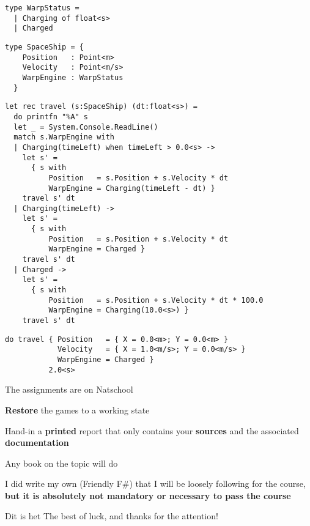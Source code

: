 \documentclass{beamer}
\begin{document}
\begin{frame}[fragile]
\begin{lstlisting}
type WarpStatus =
  | Charging of float<s>
  | Charged
\end{lstlisting}
\end{frame}

\begin{frame}[fragile]
\begin{lstlisting}
type SpaceShip = {
    Position   : Point<m>
    Velocity   : Point<m/s>
    WarpEngine : WarpStatus
  }
\end{lstlisting}
\end{frame}

\begin{frame}[fragile]
\begin{lstlisting}
let rec travel (s:SpaceShip) (dt:float<s>) =
  do printfn "%A" s
  let _ = System.Console.ReadLine()
  match s.WarpEngine with
  | Charging(timeLeft) when timeLeft > 0.0<s> ->
    let s' =
      { s with
          Position   = s.Position + s.Velocity * dt
          WarpEngine = Charging(timeLeft - dt) }
    travel s' dt
  | Charging(timeLeft) ->
    let s' =
      { s with
          Position   = s.Position + s.Velocity * dt
          WarpEngine = Charged }
    travel s' dt
  | Charged ->
    let s' =
      { s with
          Position   = s.Position + s.Velocity * dt * 100.0
          WarpEngine = Charging(10.0<s>) }
    travel s' dt
\end{lstlisting}
\end{frame}

\begin{frame}[fragile]
\begin{lstlisting}
do travel { Position   = { X = 0.0<m>; Y = 0.0<m> }
            Velocity   = { X = 1.0<m/s>; Y = 0.0<m/s> } 
            WarpEngine = Charged }
          2.0<s>
\end{lstlisting}
\end{frame}

\begin{slide}{
\item The assignments are on Natschool
\item \textbf{Restore} the games to a working state
\item Hand-in a \textbf{printed} report that only contains your \textbf{sources} and the associated \textbf{documentation}
}\end{slide}

\begin{slide}{
\item Any book on the topic will do
\item I did write my own (Friendly F\#) that I will be loosely following for the course, \textbf{but it is absolutely not mandatory or necessary to pass the course}
}\end{slide}


\begin{frame}{Dit is het}
\center
\fontsize{18pt}{7.2}\selectfont
The best of luck, and thanks for the attention!
\end{frame}
\end{document}
